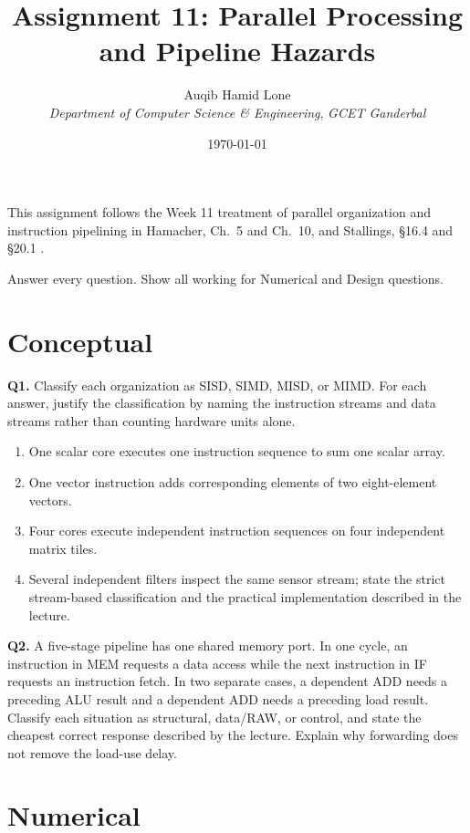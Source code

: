 \documentclass[11pt]{article}
\title{Assignment 11: Parallel Processing and Pipeline Hazards}
\author{Auqib Hamid Lone\\[0.3em]
  \emph{Department of Computer Science \& Engineering}, \emph{GCET Ganderbal}}
\date{\today}
\begin{document}
\maketitle

\noindent This assignment follows the Week 11 treatment of parallel
organization and instruction pipelining in Hamacher, Ch.~5 and Ch.~10, and
Stallings, \S16.4 and \S20.1 \cite{Hamacher2002_computer_organization,Stallings2015_computer_organization}.

\noindent Answer every question. Show all working for Numerical and Design questions.

\section{Conceptual}

\textbf{Q1.} Classify each organization as SISD, SIMD, MISD, or MIMD. For
each answer, justify the classification by naming the instruction streams and
data streams rather than counting hardware units alone.
\begin{enumerate}
  \item[(a)] One scalar core executes one instruction sequence to sum one
        scalar array.
  \item[(b)] One vector instruction adds corresponding elements of two
        eight-element vectors.
  \item[(c)] Four cores execute independent instruction sequences on four
        independent matrix tiles.
  \item[(d)] Several independent filters inspect the same sensor stream;
        state the strict stream-based classification and the practical
        implementation described in the lecture.
\end{enumerate}

\textbf{Q2.} A five-stage pipeline has one shared memory port. In one cycle,
an instruction in MEM requests a data access while the next instruction in IF
requests an instruction fetch. In two separate cases, a dependent ADD needs a
preceding ALU result and a dependent ADD needs a preceding load result.
Classify each situation as structural, data/RAW, or control, and state the
cheapest correct response described by the lecture. Explain why forwarding
does not remove the load-use delay.

\section{Numerical}
\end{document}
